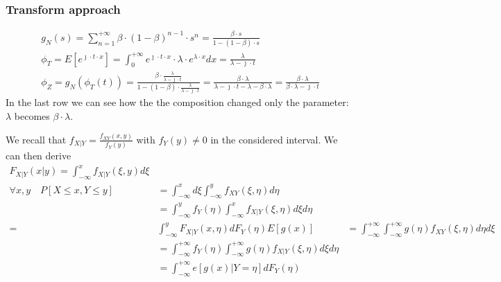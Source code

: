 \subsubsection{Transform approach}
\begin{equation}
  \begin{split}
  g_N(s)=\sum \limits_{n=1}^{+\infty} \beta \cdot (1-\beta)^{n-1}\cdot s^n = \frac{\beta \cdot s}{1-(1-\beta)\cdot s}\\
  \phi_T=E[e^{\jmath \cdot t \cdot x}] = \int_{0}^{+\infty} e^{\jmath \cdot t \cdot x} \cdot \lambda \cdot e^{ \lambda \cdot x} dx = \frac{\lambda}{\lambda - \jmath \cdot t} \\
  \phi_Z = g_N(\phi_T(t))=\frac{\beta \cdot \frac{\lambda}{\lambda - \jmath \cdot t}}{1-(1-\beta)\cdot \frac{\lambda}{\lambda - \jmath \cdot t}} =
   \frac{\beta \cdot \lambda}{\lambda - \jmath \cdot t -\lambda - \beta \cdot \lambda} = \frac{\beta \cdot \lambda}{\beta \cdot \lambda - \jmath \cdot t}
  \end{split}
\end{equation}
In the last row we can see how the the composition changed only the parameter: $\lambda$ becomes $\beta \cdot \lambda$.

We recall that $f_{X|Y} = \frac{f_{XY}(x,y)}{f_Y(y)}$ with $f_Y(y)\neq 0$ in the considered interval.
We can then derive
\begin{equation}
  \begin{split}
  F_{X|Y}(x|y) = \int_{-\infty}^{x}f_{X|Y}(\xi,y)d\xi\\
  \forall x,y \quad P[X \le x , Y \le y] &= \int_{-\infty}^{x}d\xi \int_{-\infty}^{y}f_{XY}(\xi,\eta) d\eta\\
  &=\int_{-\infty}^{y}f_Y(\eta) \int_{-\infty}^{x}f_{X|Y}(\xi,\eta) d\xi d\eta \\
  =&\int_{-\infty}^{y}F_{X|Y}(x,\eta) dF_Y(\eta)
  E[g(x)] &= \int_{-\infty}^{+\infty} \int_{-\infty}^{+\infty}g(\eta) f_{XY}(\xi,\eta) d\eta  d\xi \\
  &= \int_{-\infty}^{+\infty} f_Y(\eta) \int_{-\infty}^{+\infty}g(\eta) f_{X|Y}(\xi,\eta)   d\xi d\eta \\
  &= \int_{-\infty}^{+\infty}e[g(x)|Y=\eta] dF_Y(\eta)
  \end{split}
\end{equation}
